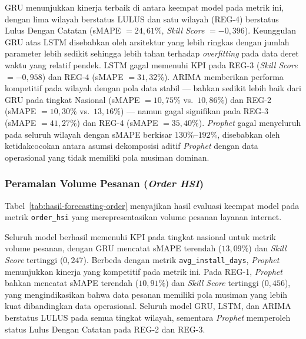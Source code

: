 

GRU menunjukkan kinerja terbaik di antara keempat model pada metrik ini, dengan lima wilayah berstatus LULUS dan satu wilayah (REG-4) berstatus Lulus Dengan Catatan (sMAPE $= 24{,}61\%$, \textit{Skill Score} $= -0{,}396$). Keunggulan GRU atas LSTM disebabkan oleh arsitektur yang lebih ringkas dengan jumlah parameter lebih sedikit sehingga lebih tahan terhadap \textit{overfitting} pada data deret waktu yang relatif pendek. LSTM gagal memenuhi KPI pada REG-3 (\textit{Skill Score} $= -0{,}958$) dan REG-4 (sMAPE \allowbreak $= 31{,}32\%$). \allowbreak ARIMA memberikan performa kompetitif pada wilayah dengan pola data stabil --- bahkan sedikit lebih baik dari GRU pada tingkat Nasional (sMAPE \allowbreak $= 10{,}75\%$ vs.\ \allowbreak $10{,}86\%$) dan REG-2 (sMAPE $= 10{,}30\%$ vs.\ $13{,}16\%$) --- namun gagal signifikan pada REG-3 (sMAPE $= 41{,}27\%$) dan REG-4 (sMAPE $= 35{,}40\%$). \textit{Prophet} gagal menyeluruh pada seluruh wilayah dengan sMAPE berkisar $130\%$--$192\%$, disebabkan oleh ketidakcocokan antara asumsi dekomposisi aditif \textit{Prophet} dengan data operasional yang tidak memiliki pola musiman dominan.

\subsubsection{Peramalan Volume Pesanan (\textit{Order HSI})}

Tabel~\ref{tab:hasil-forecasting-order} menyajikan hasil evaluasi keempat model pada metrik \texttt{order\_}\allowbreak\texttt{hsi} yang merepresentasikan volume pesanan layanan internet.



Seluruh model berhasil memenuhi KPI pada tingkat nasional untuk metrik volume pesanan, dengan GRU mencatat sMAPE terendah ($13{,}09\%$) dan \textit{Skill Score} tertinggi ($0{,}247$). Berbeda dengan metrik \texttt{avg\_}\allowbreak\texttt{install\_}\allowbreak\texttt{days}, \textit{Prophet} menunjukkan kinerja yang kompetitif pada metrik ini. Pada REG-1, \textit{Prophet} bahkan mencatat sMAPE terendah ($10{,}91\%$) dan \textit{Skill Score} tertinggi ($0{,}456$), yang mengindikasikan bahwa data pesanan memiliki pola musiman yang lebih kuat dibandingkan data operasional. Seluruh model GRU, LSTM, dan ARIMA berstatus LULUS pada semua tingkat wilayah, sementara \textit{Prophet} memperoleh status Lulus Dengan Catatan pada REG-2 dan REG-3.

